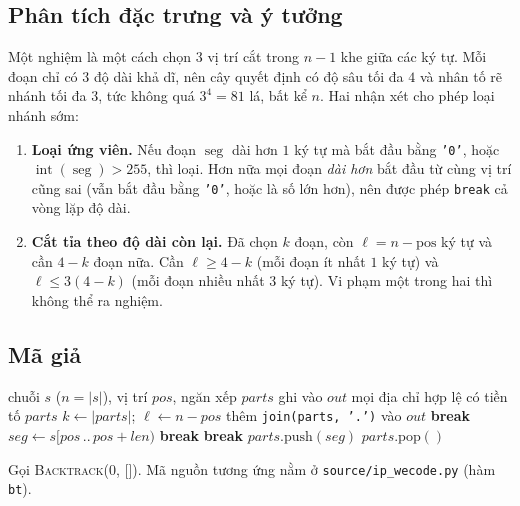 \documentclass[12pt,a4paper]{article}
\begin{document}
\subsection{Phân tích đặc trưng và ý tưởng}
Một nghiệm là một cách chọn $3$ vị trí cắt trong $n-1$ khe giữa các ký tự. Mỗi đoạn chỉ có $3$ độ dài khả dĩ, nên cây quyết định có độ sâu tối đa $4$ và nhân tố rẽ nhánh tối đa $3$, tức không quá $3^4 = 81$ lá, bất kể $n$.
Hai nhận xét cho phép loại nhánh sớm:
\begin{enumerate}
    \item \textbf{Loại ứng viên.} Nếu đoạn $\operatorname{seg}$ dài hơn $1$ ký tự mà bắt đầu bằng \texttt{'0'}, hoặc $\operatorname{int}(\operatorname{seg}) > 255$, thì loại. Hơn nữa mọi đoạn \emph{dài hơn} bắt đầu từ cùng vị trí cũng sai (vẫn bắt đầu bằng \texttt{'0'}, hoặc là số lớn hơn), nên được phép \texttt{break} cả vòng lặp độ dài.
    \item \textbf{Cắt tỉa theo độ dài còn lại.} Đã chọn $k$ đoạn, còn $\ell = n - \text{pos}$ ký tự và cần $4-k$ đoạn nữa. Cần $\ell \ge 4-k$ (mỗi đoạn ít nhất $1$ ký tự) và $\ell \le 3(4-k)$ (mỗi đoạn nhiều nhất $3$ ký tự). Vi phạm một trong hai thì không thể ra nghiệm.
\end{enumerate}

\subsection{Mã giả}
\begin{algorithm}[H]
\caption{\textsc{Backtrack}(pos, parts)}
\begin{algorithmic}[1]
\Require chuỗi $s$ ($n = |s|$), vị trí $pos$, ngăn xếp $parts$
\Ensure ghi vào $out$ mọi địa chỉ hợp lệ có tiền tố $parts$
\State $k \gets |parts|$; \quad $\ell \gets n - pos$
 \Return {}
\EndIf
{}
     thêm \texttt{join(parts, '.')} vào $out$ \EndIf
    \State \Return
\EndIf
{}
     \textbf{break} \EndIf
    \State $seg \gets s[pos \,..\, pos+len)$
     \textbf{break} \EndIf
     \textbf{break} \EndIf
    \State $parts.\text{push}(seg)$
    \State {}
    \State $parts.\text{pop}()$
\EndFor
\end{algorithmic}
\end{algorithm}
Gọi \textsc{Backtrack}(0, []). Mã nguồn tương ứng nằm ở \texttt{source/ip\_wecode.py} (hàm \texttt{bt}).
\end{document}
